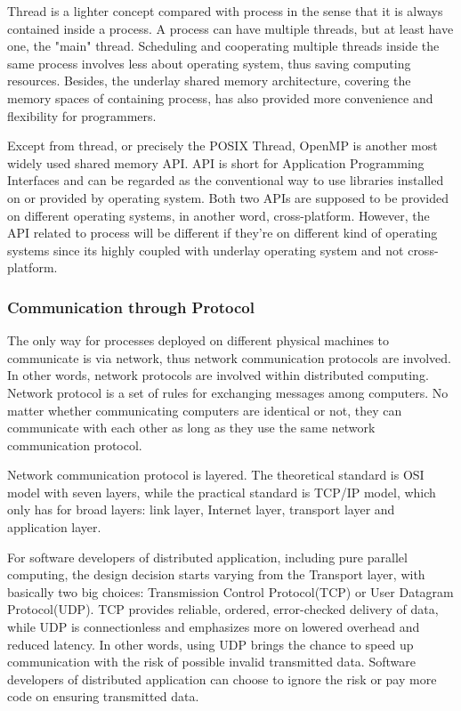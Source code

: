 \documentclass[12pt,a4paper]{report}
\begin{document}
Thread is a lighter concept compared with process in the sense that it is always contained inside a process. A process can have multiple threads, but at least have one, the "main" thread. Scheduling and cooperating multiple threads inside the same process involves less about operating system, thus saving computing resources. Besides, the underlay shared memory architecture, covering the memory spaces of containing process, has also provided more convenience and flexibility for programmers.

Except from thread, or precisely the POSIX Thread, OpenMP is another most widely used shared memory API. API is short for Application Programming Interfaces and can be regarded as the conventional way to use libraries installed on or provided by operating system. Both two APIs are supposed to be provided on different operating systems, in another word, cross-platform. However, the API related to process will be different if they're on different kind of operating systems since its highly coupled with underlay operating system and not cross-platform.

\subsubsection{Communication through Protocol}

The only way for processes deployed on different physical machines to communicate is via network, thus network communication protocols are involved. In other words, network protocols are involved within distributed computing. Network protocol is a set of rules for exchanging messages among computers. No matter whether communicating computers are identical or not, they can communicate with each other as long as they use the same network communication protocol.

Network communication protocol is layered. The theoretical standard is OSI model with seven layers, while the practical standard is TCP/IP model, which only has for broad layers: link layer, Internet layer, transport layer and application layer.

For software developers of distributed application, including pure parallel computing, the design decision starts varying from the Transport layer, with basically two big choices: Transmission Control Protocol(TCP) or User Datagram Protocol(UDP). TCP provides reliable, ordered, error-checked delivery of data, while UDP is connectionless and emphasizes more on lowered overhead and reduced latency. In other words, using UDP brings the chance to speed up communication with the risk of possible invalid transmitted data. Software developers of distributed application can choose to ignore the risk or pay more code on ensuring transmitted data.
\end{document}

